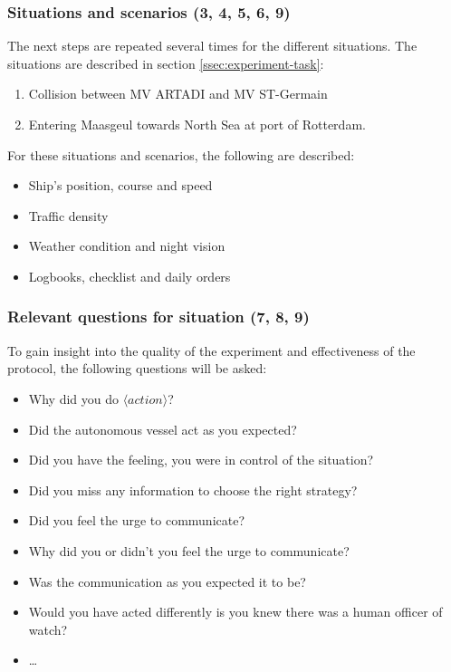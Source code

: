 
\subsubsection{Situations and scenarios (3, 4, 5, 6, 9)}
The next steps are repeated several times for the different situations. The situations are described in section \ref{ssec:experiment-task}:
\begin{enumerate}
	\item Collision between MV ARTADI and MV ST-Germain
	\item Entering Maasgeul towards North Sea at port of Rotterdam.
\end{enumerate}

For these situations and scenarios, the following are described:
\begin{itemize}
	\item Ship's position, course and speed
	\item Traffic density
	\item Weather condition and night vision
	\item Logbooks, checklist and daily orders
\end{itemize}


\subsubsection{Relevant questions for situation (7, 8, 9)}
To gain insight into the quality of the experiment and effectiveness of the protocol, the following questions will be asked:
\begin{itemize}
	\item Why did you do $\langle action \rangle$?
	\item Did the autonomous vessel act as you expected?
	\item Did you have the feeling, you were in control of the situation?
	\item Did you miss any information to choose the right strategy?
	\item Did you feel the urge to communicate?
	\item Why did you or didn't you feel the urge to communicate?
	\item Was the communication as you expected it to be?
	\item Would you have acted differently is you knew there was a human officer of watch?
	\item \dots {}
\end{itemize}


